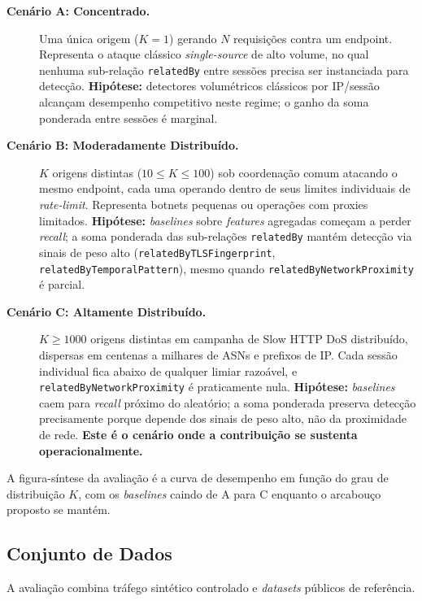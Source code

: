 \documentclass[preprint,12pt]{elsarticle}
\begin{document}
\begin{description}
    \item[\textbf{Cenário A: Concentrado.}] Uma única origem ($K = 1$) gerando $N$ requisições contra um endpoint. Representa o ataque clássico \emph{single-source} de alto volume, no qual nenhuma sub-relação \texttt{relatedBy} entre sessões precisa ser instanciada para detecção. \textbf{Hipótese:} detectores volumétricos clássicos por IP/sessão alcançam desempenho competitivo neste regime; o ganho da soma ponderada entre sessões é marginal.
    \item[\textbf{Cenário B: Moderadamente Distribuído.}] $K$ origens distintas ($10 \le K \le 100$) sob coordenação comum atacando o mesmo endpoint, cada uma operando dentro de seus limites individuais de \emph{rate-limit}. Representa botnets pequenas ou operações com proxies limitados. \textbf{Hipótese:} \emph{baselines} sobre \emph{features} agregadas começam a perder \emph{recall}; a soma ponderada das sub-relações \texttt{relatedBy} mantém detecção via sinais de peso alto (\texttt{relatedByTLSFingerprint}, \texttt{relatedByTemporalPattern}), mesmo quando \texttt{relatedByNetworkProximity} é parcial.
    \item[\textbf{Cenário C: Altamente Distribuído.}] $K \ge 1000$ origens distintas em campanha de Slow HTTP DoS distribuído, dispersas em centenas a milhares de ASNs e prefixos de IP. Cada sessão individual fica abaixo de qualquer limiar razoável, e \texttt{relatedByNetworkProximity} é praticamente nula. \textbf{Hipótese:} \emph{baselines} caem para \emph{recall} próximo do aleatório; a soma ponderada preserva detecção precisamente porque depende dos sinais de peso alto, não da proximidade de rede. \textbf{Este é o cenário onde a contribuição se sustenta operacionalmente.}
\end{description}

A figura-síntese da avaliação é a curva de desempenho em função do grau de distribuição $K$, com os \emph{baselines} caindo de A para C enquanto o arcabouço proposto se mantém.

\subsection{Conjunto de Dados}

A avaliação combina tráfego sintético controlado e \emph{datasets} públicos de referência.
\end{document}
